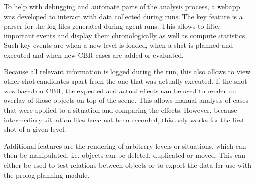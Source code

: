To help with debugging and automate parts of the analysis process, a webapp was developed to interact with data collected during runs.
The key feature is a parser for the log files generated during agent runs. This allows to filter important events and display them chronologically as well as compute statistics.
Such key events are when a new level is loaded, when a shot is planned and executed and when new \ac{CBR} cases are added or evaluated.

Because all relevant information is logged during the run, this also allows to view other shot candidates apart from the one that was actually executed.
If the shot was based on \ac{CBR}, the expected and actual effects can be used to render an overlay of those objects on top of the scene.
This allows manual analysis of cases that were applied to a situation and comparing the effects.
However, because intermediary situation files have not been recorded, this only works for the first shot of a given level.


Additional features are the rendering of arbitrary levels or situations, which can then be manipulated, i.e. objects can be deleted, duplicated or moved.
This can either be used to test relations between objects or to export the data for use with the prolog planning module.
